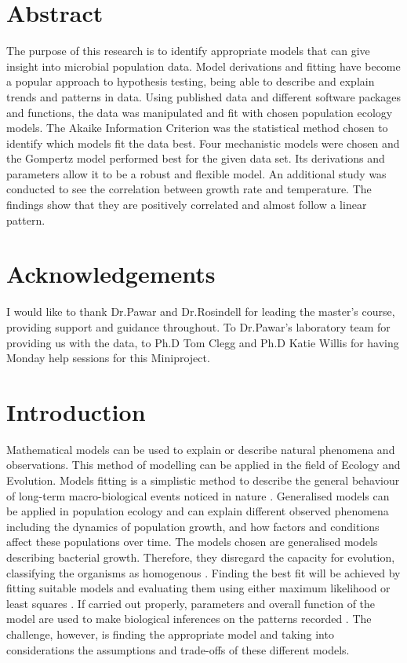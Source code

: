 \documentclass[11pt]{article}
\begin{document}


\newpage

\linenumbers

\section*{Abstract}
The purpose of this research is to identify appropriate models that can give insight into microbial population data. Model derivations and fitting have become a popular approach to hypothesis testing, being able to describe and explain trends and patterns in data. Using published data and different software packages and functions, the data was manipulated and fit with chosen population ecology models. The Akaike Information Criterion was the statistical method chosen to identify which models fit the data best. Four mechanistic models were chosen and the Gompertz model performed best for the given data set. Its derivations and parameters allow it to be a robust and flexible model. An additional study was conducted to see the correlation between growth rate and temperature. The findings show that they are positively correlated and almost follow a linear pattern.

\newpage

\section*{Acknowledgements}
I would like to thank Dr.Pawar and Dr.Rosindell for leading the master's course, providing support and guidance throughout. To Dr.Pawar's laboratory team for providing us with the data, to Ph.D Tom Clegg and Ph.D Katie Willis for having Monday help sessions for this Miniproject.

\newpage

\tableofcontents

\newpage

\section{Introduction}
Mathematical models can be used to explain or describe natural phenomena and observations. This method of modelling can be applied in the field of Ecology and Evolution. Models fitting is a simplistic method to describe the general behaviour of long-term macro-biological events noticed in nature \cite{johnson2004model}. Generalised models can be applied in population ecology and can explain different observed phenomena including the dynamics of population growth, and how factors and conditions affect these populations over time. The models chosen are generalised models describing bacterial growth. Therefore, they disregard the capacity for evolution, classifying the organisms as homogenous \cite{levins1966strategy}. Finding the best fit will be achieved by fitting suitable models and evaluating them using either maximum likelihood or least squares \cite{johnson2004model}. If carried out properly, parameters and overall function of the model are used to make biological inferences on the patterns recorded \cite{johnson2004model}. The challenge, however, is finding the appropriate model and taking into considerations the assumptions and trade-offs of these different models.
\end{document}
